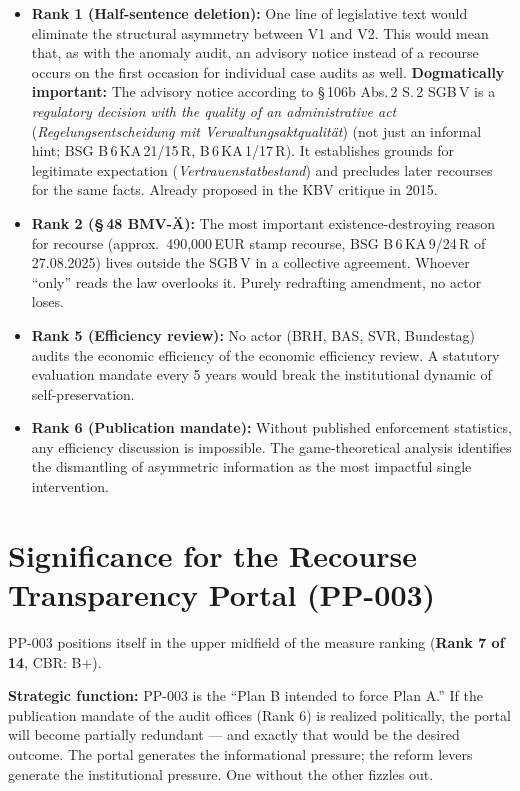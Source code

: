 \documentclass{umbruch-position}
\begin{document}
\begin{itemize}
  \item \textbf{Rank 1 (Half-sentence deletion):} One line of legislative text would eliminate the structural asymmetry between V1 and V2. This would mean that, as with the anomaly audit, an advisory notice instead of a recourse occurs on the first occasion for individual case audits as well. \textbf{Dogmatically important:} The advisory notice according to \S\,106b Abs.\,2 S.\,2 SGB\,V is a \textit{regulatory decision with the quality of an administrative act} (\textit{Regelungsentscheidung mit Verwaltungsaktqualit\"at}) (not just an informal hint; BSG B\,6\,KA\,21/15\,R, B\,6\,KA\,1/17\,R). It establishes grounds for legitimate expectation (\textit{Vertrauenstatbestand}) and precludes later recourses for the same facts. Already proposed in the KBV critique in 2015.
  \item \textbf{Rank 2 (\S\,48 BMV-\"A):} The most important existence-destroying reason for recourse (approx.\ 490,000\,EUR stamp recourse, BSG B\,6\,KA\,9/24\,R of 27.08.2025) lives outside the SGB\,V in a collective agreement. Whoever ``only'' reads the law overlooks it. Purely redrafting amendment, no actor loses.
  \item \textbf{Rank 5 (Efficiency review):} No actor (BRH, BAS, SVR, Bundestag) audits the economic efficiency of the economic efficiency review. A statutory evaluation mandate every 5 years would break the institutional dynamic of self-preservation.
  \item \textbf{Rank 6 (Publication mandate):} Without published enforcement statistics, any efficiency discussion is impossible. The game-theoretical analysis identifies the dismantling of asymmetric information as the most impactful single intervention.
\end{itemize}

\section{Significance for the Recourse Transparency Portal (PP-003)}

PP-003 positions itself in the upper midfield of the measure ranking (\textbf{Rank 7 of 14}, CBR: B+).

\textbf{Strategic function:} PP-003 is the ``Plan B intended to force Plan A.'' If the publication mandate of the audit offices (Rank 6) is realized politically, the portal will become partially redundant --- and exactly that would be the desired outcome. The portal generates the informational pressure; the reform levers generate the institutional pressure. One without the other fizzles out.
\end{document}
